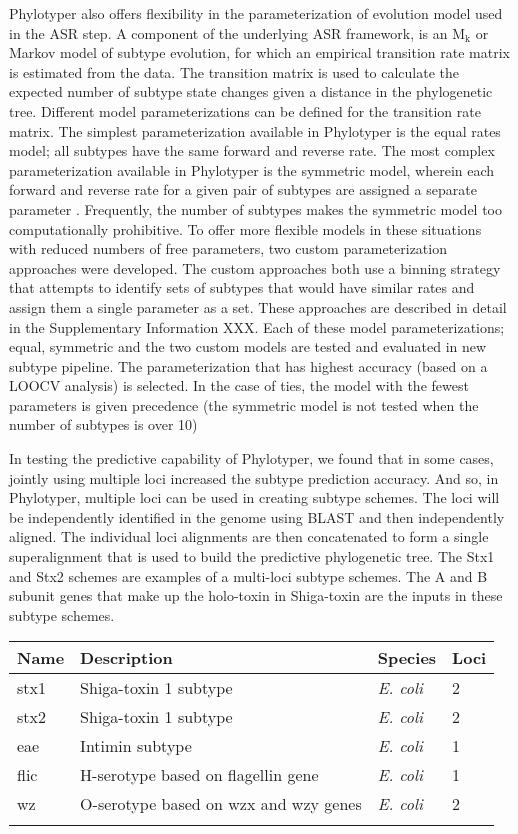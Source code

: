 \documentclass{bioinfo}
\begin{document}
Phylotyper also offers flexibility in the parameterization of evolution model used in the ASR step.
A component of the underlying ASR framework, is an $\text{M}_{\text{k}}$ or Markov model of subtype evolution, for which an empirical transition rate matrix is estimated from the data.
The transition matrix is used to calculate the expected number of subtype state changes given a distance in the phylogenetic tree.  
Different model parameterizations can be defined for the transition rate matrix. 
The simplest parameterization available in Phylotyper is the equal rates model; all subtypes have the same forward and reverse rate.  
The most complex parameterization available in Phylotyper is the symmetric model, wherein each forward and reverse rate for a given pair of subtypes are assigned a separate parameter \citep{Revell2011}.
Frequently, the number of subtypes makes the symmetric model too computationally prohibitive.
To offer more flexible models in these situations with reduced numbers of free parameters, two custom parameterization approaches were developed.
The custom approaches both use a binning strategy that attempts to identify sets of subtypes that would have similar rates and assign them a single parameter as a set.
These approaches are described in detail in the Supplementary Information XXX.
Each of these model parameterizations; equal, symmetric and the two custom models are tested and evaluated in new subtype pipeline.
The parameterization that has highest accuracy (based on a LOOCV analysis) is selected.
In the case of ties, the model with the fewest parameters is given precedence (the symmetric model is not tested when the number of subtypes is over 10)

In testing the predictive capability of Phylotyper, we found that in some cases, jointly using multiple loci increased the subtype prediction accuracy.  
And so, in Phylotyper, multiple loci can be used in creating subtype schemes.
The loci will be independently identified in the genome using BLAST and then independently aligned.  
The individual loci alignments are then concatenated to form a single superalignment that is used to build the predictive phylogenetic tree.  
The Stx1 and Stx2 schemes are examples of a multi-loci subtype schemes.  
The A and B subunit genes that make up the holo-toxin in Shiga-toxin are the inputs in these subtype schemes.

\begin{table}[!t]
 {\begin{tabular}{@{}llll@{}}\toprule Name &
Description & Species & Loci\\\midrule
stx1 & Shiga-toxin 1 subtype & {\it E. coli} & 2 \\
stx2 & Shiga-toxin 1 subtype & {\it E. coli} & 2\\
eae & Intimin subtype & {\it E. coli} & 1\\
flic & H-serotype based on flagellin gene & {\it E. coli} & 1\\
wz & O-serotype based on wzx and wzy genes & {\it E. coli} & 2\\\botrule
\end{tabular}}{}
\end{table}
\end{document}
